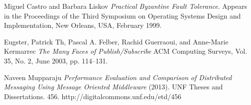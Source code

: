 \documentclass[conference]{IEEEtran}
\begin{document}
{}

\begin{thebibliography}{9}
Miguel Castro and Barbara Liskov
\textit{Practical Byzantine Fault Tolerance}. 
Appears in the Proceedings of the Third Symposium on Operating Systems Design and Implementation, New Orleans, USA, February 1999.

Eugster, Patrick Th, Pascal A. Felber, Rachid Guerraoui, and Anne-Marie Kermarrec
\textit{The Many Faces of Publish/Subscribe}
ACM Computing Surveys, Vol. 35, No. 2, June 2003, pp. 114–131.
 
Naveen Mupparaju
\textit{Performance Evaluation and Comparison of Distributed Messaging Using Message Oriented Middleware}
(2013). UNF Theses and Dissertations. 456.
http://digitalcommons.unf.edu/etd/456
 
\end{thebibliography}
\end{document}
